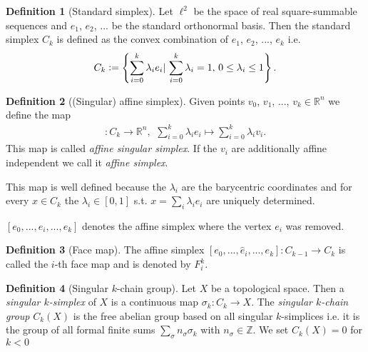 \documentclass[12pt,a4paper]{article}
\theoremstyle{definition}
\newtheorem{definition}{Definition}
\newcommand{\real}{\mathbb{R}}
\begin{document}
\begin{definition}[Standard simplex]
    Let $\ell^2$ be the space of real square-summable sequences and 
    $e_1$, $e_2$, ... be the standard orthonormal basis. Then the 
    standard simplex
    $C_k$ is defined as the convex combination of $e_1$, $e_2$, ..., $e_k$
    i.e.
    \begin{align*}
        C_k \vcentcolon= \left\{ \sum\limits_{i=0}^k \lambda_i e_i | \,
        \sum\limits_{i=0}^k \lambda_i = 1,\, 0 \leq \lambda_i \leq 1 \right\}.
    \end{align*}
\end{definition}

\begin{definition}[(Singular) affine simplex]
    Given points $v_0$, $v_1$, ..., $v_k \in \real^n$ we define the map 
    \begin{align*}
        [v_0,...,v_k]: C_k \rightarrow \real^n,\, \
        \sum\limits_{i=0}^k \lambda_i e_i \mapsto 
        \sum\limits_{i=0}^k \lambda_i v_i.
    \end{align*}
    This map is called \textit{affine singular simplex}. If the 
    $v_i$ are additionally affine independent we call it 
    \textit{affine simplex}.
\end{definition}
\noindent This map is well defined because the $\lambda_i$ are the barycentric
coordinates and for every $x \in C_k$ the $\lambda_i \in [0,1]$ 
s.t. $x = \sum_i \lambda_i e_i$ are uniquely determined.

$[e_0,...,\hat{e}_i,...,e_k]$ denotes the affine simplex where the vertex $e_i$
was removed. 
\begin{definition}[Face map]
    The affine simplex $[e_0,...,\hat{e}_i,...,e_k]: C_{k-1} \rightarrow 
    C_k$ is called the $i$-th face map and is denoted by $F_i^k$.
\end{definition}


\begin{definition}[Singular $k$-chain group]
    Let $X$ be a topological space. Then a \textit{singular $k$-simplex} of $X$
    is a continuous map $\sigma_k: C_k \rightarrow X$. 
    The \textit{singular $k$-chain group} $C_k(X)$ is the free abelian
    group based on all singular $k$-simplices i.e. it is the group of all 
    formal finite sums $\sum_\sigma n_\sigma \sigma_k$ with $n_\sigma \in 
    \mathbb{Z}$. We set $C_k(X) = 0$ for $k<0$
\end{definition}
\end{document}
